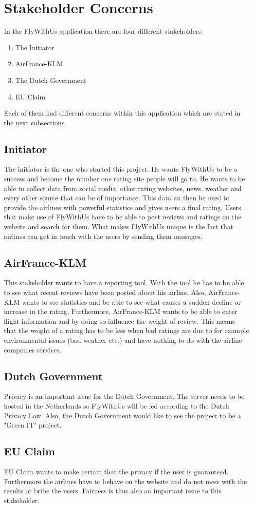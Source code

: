 \section{Stakeholder Concerns}

In the FlyWithUs application there are four different stakeholders:
\begin{enumerate}
\item The Initiator
\item AirFrance-KLM
\item The Dutch Government
\item EU Claim
\end{enumerate}

Each of them had different concerns within this application which are stated in the next subsections.

\subsection{Initiator}
The initiator is the one who started this project. He wants FlyWithUs to be a success and become the number one rating site people will go to. He wants to be able to collect data from social media, other rating websites, news, weather and every other source that can be of importance. This data an then be used to provide the airlines with powerful statistics and gives users a final rating. Users that make use of FlyWithUs have to be able to post reviews and ratings on the website and search for them. What makes FlyWithUs unique is the fact that airlines can get in touch with the users by sending them messages.

\subsection{AirFrance-KLM}
This stakeholder wants to have a reporting tool. With the tool he has to be able to see what recent reviews have been posted about his airline. Also, AirFrance-KLM wants to see statistics and be able to see what causes a sudden decline or increase in the rating. Furthermore, AirFrance-KLM wants to be able to enter flight information and by doing so influence the weight of review. This means that the weight of a rating has to be less when bad ratings are due to for example environmental issues (bad weather etc.) and have nothing to do with the airline companies services.

\subsection{Dutch Government}
Privacy is an important issue for the Dutch Government. The server needs to be hosted in the Netherlands so FlyWithUs will be led according to the Dutch Privacy Law. Also, the Dutch Government would like to see the project to be a "Green IT" project. 

\subsection{EU Claim}
EU Claim wants to make certain that the privacy if the user is guaranteed. Furthermore the airlines have to behave on the website and do not mess with the results or bribe the users. Fairness is thus also an important issue to this stakeholder.
